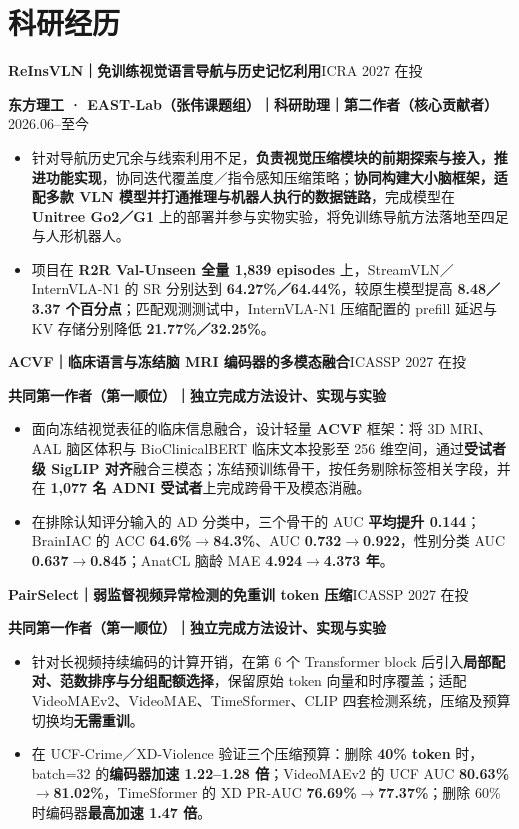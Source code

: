 \documentclass[11pt,a4paper]{article}
\newcommand{\entry}[2]{\par\noindent\textbf{#1}\hfill #2\par}
\newcommand{\researchmeta}[1]{{\fontsize{9.8}{12}\selectfont #1\par}\vspace{1pt}}
\begin{document}
\section{科研经历}
\entry{ReInsVLN｜免训练视觉语言导航与历史记忆利用}{ICRA 2027 在投}
\researchmeta{\textbf{东方理工 · EAST-Lab（张伟课题组）｜科研助理｜第二作者（核心贡献者）}\hfill 2026.06--至今}
\begin{itemize}
\item 针对导航历史冗余与线索利用不足，\textbf{负责视觉压缩模块的前期探索与接入，推进功能实现}，协同迭代覆盖度／指令感知压缩策略；\textbf{协同构建大小脑框架，适配多款 VLN 模型并打通推理与机器人执行的数据链路}，完成模型在 \textbf{Unitree Go2／G1} 上的部署并参与实物实验，将免训练导航方法落地至四足与人形机器人。
\item 项目在 \textbf{R2R Val-Unseen 全量 1,839 episodes} 上，StreamVLN／InternVLA-N1 的 SR 分别达到 \textbf{64.27\%／64.44\%}，较原生模型提高 \textbf{8.48／3.37 个百分点}；匹配观测测试中，InternVLA-N1 压缩配置的 prefill 延迟与 KV 存储分别降低 \textbf{21.77\%／32.25\%}。
\end{itemize}

\vspace{3pt}
\entry{ACVF｜临床语言与冻结脑 MRI 编码器的多模态融合}{ICASSP 2027 在投}
\researchmeta{\textbf{共同第一作者（第一顺位）｜独立完成方法设计、实现与实验}}
\begin{itemize}
\item 面向冻结视觉表征的临床信息融合，设计轻量 \textbf{ACVF} 框架：将 3D MRI、AAL 脑区体积与 BioClinicalBERT 临床文本投影至 256 维空间，通过\textbf{受试者级 SigLIP 对齐}融合三模态；冻结预训练骨干，按任务剔除标签相关字段，并在 \textbf{1,077 名 ADNI 受试者}上完成跨骨干及模态消融。
\item 在排除认知评分输入的 AD 分类中，三个骨干的 AUC \textbf{平均提升 0.144}；BrainIAC 的 ACC \textbf{64.6\%$\rightarrow$84.3\%}、AUC \textbf{0.732$\rightarrow$0.922}，性别分类 AUC \textbf{0.637$\rightarrow$0.845}；AnatCL 脑龄 MAE \textbf{4.924$\rightarrow$4.373 年}。
\end{itemize}

\vspace{3pt}
\entry{PairSelect｜弱监督视频异常检测的免重训 token 压缩}{ICASSP 2027 在投}
\researchmeta{\textbf{共同第一作者（第一顺位）｜独立完成方法设计、实现与实验}}
\begin{itemize}
\item 针对长视频持续编码的计算开销，在第 6 个 Transformer block 后引入\textbf{局部配对、范数排序与分组配额选择}，保留原始 token 向量和时序覆盖；适配 VideoMAEv2、VideoMAE、TimeSformer、CLIP 四套检测系统，压缩及预算切换均\textbf{无需重训}。
\item 在 UCF-Crime／XD-Violence 验证三个压缩预算：删除 \textbf{40\% token} 时，batch=32 的\textbf{编码器加速 1.22--1.28 倍}；VideoMAEv2 的 UCF AUC \textbf{80.63\%$\rightarrow$81.02\%}，TimeSformer 的 XD PR-AUC \textbf{76.69\%$\rightarrow$77.37\%}；删除 60\% 时编码器\textbf{最高加速 1.47 倍}。
\end{itemize}
\end{document}
